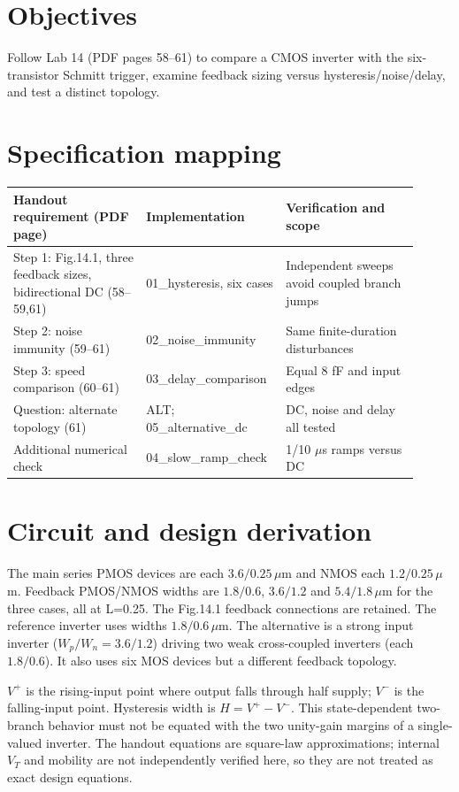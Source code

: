 \section{Objectives}
Follow Lab 14 (PDF pages 58--61) to compare a CMOS inverter with the six-transistor Schmitt trigger, examine feedback sizing versus hysteresis/noise/delay, and test a distinct topology.

\section{Specification mapping}
\begin{longtable}{p{0.31\linewidth}p{0.29\linewidth}p{0.31\linewidth}}
\toprule
Handout requirement (PDF page) & Implementation & Verification and scope \\\midrule
Step 1: Fig.14.1, three feedback sizes, bidirectional DC (58--59,61) & 01\_hysteresis, six cases & Independent sweeps avoid coupled branch jumps \\
Step 2: noise immunity (59--61) & 02\_noise\_immunity & Same finite-duration disturbances \\
Step 3: speed comparison (60--61) & 03\_delay\_comparison & Equal 8 fF and input edges \\
Question: alternate topology (61) & ALT; 05\_alternative\_dc & DC, noise and delay all tested \\
Additional numerical check & 04\_slow\_ramp\_check & 1/10 $\mu$s ramps versus DC \\
\bottomrule
\end{longtable}


\section{Circuit and design derivation}
The main series PMOS devices are each $3.6/0.25\,\mu$m and NMOS each $1.2/0.25\,\mu$m. Feedback PMOS/NMOS widths are $1.8/0.6$, $3.6/1.2$ and $5.4/1.8\,\mu$m for the three cases, all at L=0.25. The Fig.14.1 feedback connections are retained. The reference inverter uses widths $1.8/0.6\,\mu$m. The alternative is a strong input inverter ($W_p/W_n=3.6/1.2$) driving two weak cross-coupled inverters (each $1.8/0.6$). It also uses six MOS devices but a different feedback topology.

$V^+$ is the rising-input point where output falls through half supply; $V^-$ is the falling-input point. Hysteresis width is $H=V^+-V^-$. This state-dependent two-branch behavior must not be equated with the two unity-gain margins of a single-valued inverter. The handout equations are square-law approximations; internal $V_T$ and mobility are not independently verified here, so they are not treated as exact design equations.

